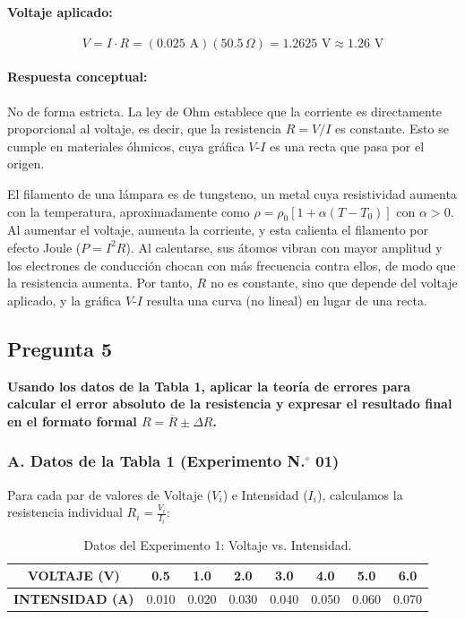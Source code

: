 \documentclass[12pt,a4paper]{article}
\begin{document}
\paragraph{Voltaje aplicado:}
\begin{equation}
V = I \cdot R = (0.025\text{ A})(50.5\,\Omega) = 1.2625\text{ V} \approx 1.26\text{ V}
\end{equation}

\paragraph{Respuesta conceptual:}
No de forma estricta. La ley de Ohm establece que la corriente es directamente proporcional al voltaje, es decir, que la resistencia $R = V/I$ es constante. Esto se cumple en materiales óhmicos, cuya gráfica $V$-$I$ es una recta que pasa por el origen.

El filamento de una lámpara es de tungsteno, un metal cuya resistividad aumenta con la temperatura, aproximadamente como $\rho = \rho_0 [1 + \alpha(T - T_0)]$ con $\alpha > 0$. Al aumentar el voltaje, aumenta la corriente, y esta calienta el filamento por efecto Joule ($P = I^2 R$). Al calentarse, sus átomos vibran con mayor amplitud y los electrones de conducción chocan con más frecuencia contra ellos, de modo que la resistencia aumenta. Por tanto, $R$ no es constante, sino que depende del voltaje aplicado, y la gráfica $V$-$I$ resulta una curva (no lineal) en lugar de una recta.

\subsection*{Pregunta 5}
\textbf{Usando los datos de la Tabla 1, aplicar la teoría de errores para calcular el error absoluto de la resistencia y expresar el resultado final en el formato formal $R = \overline{R} \pm \Delta R$.}

\subsubsection*{A. Datos de la Tabla 1 (Experimento N.$^\circ$ 01)}
Para cada par de valores de Voltaje ($V_i$) e Intensidad ($I_i$), calculamos la resistencia individual $R_i = \frac{V_i}{I_i}$:

\begin{table}[H]
\centering
\begin{tabular}{|c|c|c|c|c|c|c|c|}
\hline
\textbf{VOLTAJE (V)} & 0.5 & 1.0 & 2.0 & 3.0 & 4.0 & 5.0 & 6.0 \\ \hline
\textbf{INTENSIDAD (A)} & 0.010 & 0.020 & 0.030 & 0.040 & 0.050 & 0.060 & 0.070 \\ \hline
\end{tabular}
\caption{Datos del Experimento 1: Voltaje vs. Intensidad.}
\end{table}
\end{document}
